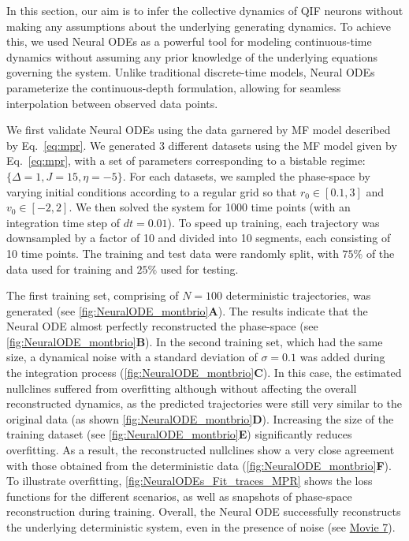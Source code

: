 \documentclass[preprint,11pt,authoryear]{elsarticle}
\begin{document}
In this section, our aim is to infer the collective dynamics of QIF neurons without making any assumptions about the underlying generating dynamics. To achieve this, we used Neural ODEs as a powerful tool for modeling continuous-time dynamics without assuming any prior knowledge of the underlying equations governing the system. Unlike traditional discrete-time models, Neural ODEs parameterize the continuous-depth formulation, allowing for seamless interpolation between observed data points.


We first validate Neural ODEs using the data garnered by MF model described by Eq.~\eqref{eq:mpr}.  We generated 3 different datasets using the MF model given by Eq.~\eqref{eq:mpr}, with a set of parameters corresponding to a bistable regime: $\{\Delta=1,J=15,\eta=-5\}$. For each datasets, we sampled the phase-space by varying initial conditions according to a regular grid so that $r_0\in[0.1, 3]$ and $v_0\in[-2,2]$. We then solved the system for 1000 time points (with an integration time step of $dt=0.01$). To speed up training, each trajectory was downsampled by a factor of 10 and divided into 10 segments, each consisting of 10 time points. The training and test data were randomly split, with $75\%$ of the data used for training and $25\%$ used for testing. 


The first training set, comprising of $N=100$ deterministic trajectories, was generated (see \autoref{fig:NeuralODE_montbrio}\textbf{A}). The results indicate that the Neural ODE almost perfectly reconstructed the phase-space (see \autoref{fig:NeuralODE_montbrio}\textbf{B}). In the second training set, which had the same size, a dynamical noise with a standard deviation of $\sigma=0.1$ was added during the integration process (\autoref{fig:NeuralODE_montbrio}\textbf{C}). In this case, the estimated nullclines suffered from overfitting although without affecting the overall reconstructed dynamics, as the predicted trajectories were still very similar to the original data  (as shown \autoref{fig:NeuralODE_montbrio}\textbf{D}). Increasing the size of the training dataset (see \autoref{fig:NeuralODE_montbrio}\textbf{E}) significantly reduces overfitting.  As a result, the reconstructed nullclines show a very close agreement with those obtained from the deterministic data (\autoref{fig:NeuralODE_montbrio}\textbf{F}).
To illustrate overfitting, \autoref{fig:NeuralODEs_Fit_traces_MPR} shows the loss functions for the different scenarios, as well as snapshots of phase-space reconstruction during training. Overall, the Neural ODE successfully reconstructs the underlying deterministic system, even in the presence of noise (see \href{run:./Videos/Movie7_MPR_PhasePlane_NeuralODEs.mp4}{Movie 7}).
\end{document}
